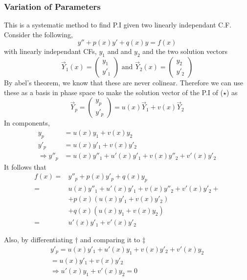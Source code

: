 \documentclass{article}
\begin{document}
\subsubsection{Variation of Parameters}
This is a systematic method to find P.I given two linearly independant C.F. 
Consider the following,
\[
    y'' + p(x) y' + q(x) y = f(x) \tag{$\star$}
\]
with linearly independant CFs, $y_1$ and and $y_2$ and the two solution vectors
\[
    \vec Y_1 (x) = \begin{pmatrix}
        y_1 \\ y'_1
    \end{pmatrix} \text{  and  }
    \vec Y_2 (x) = \begin{pmatrix}
        y_2 \\ y'_2
    \end{pmatrix}
\]
By abel's theorem, we know that these are never colinear. 
Therefore we can use these as a basis in phase space to make the solution vector of the P.I of ($\star$) as
\[
    \vec Y_p = \begin{pmatrix}
        y_p \\ y'_p
    \end{pmatrix} = u(x) \vec Y_1 + v(x) \vec Y_2
\]
In components,
\begin{align*}
    y_p &= u(x) y_1 + v(x) y_2 \tag{$\dagger$}\\
    y'_p &= u(x) y'_1 + v(x) y'_2 \tag{$\ddagger$}\\
    \Rightarrow y''_p &= u(x) y''_1 + u'(x) y'_1 + v(x) y''_2 + v'(x) y'_2
\end{align*}
It follows that
\begin{align*}
    f(x) =& y''_p + p(x) y'_p + q(x) y_p \\
    =& u(x) y''_1 + u'(x) y'_1 + v(x) y''_2 + v'(x) y'_2 + \\
    &+ p(x) (u(x) y'_1 + v(x) y'_2) \\
    &+ q(x) (u(x) y_1 + v(x) y_2) \\
    =& u'(x)y'_1 + v'(x)y'_2
\end{align*}

Also, by differentiating $\dagger$ and comparing it to $\ddagger$
\begin{align*}
    y'_p = u(x) y'_1 + u'(x) y_1 + v(x) y'_2 + v'(x) y_2 \\
    = u(x) y'_1 + v(x) y'_2 \tag{compare to $\ddagger$} \\
    \Rightarrow u'(x) y_1 + v'(x) y_2 = 0
\end{align*}
\end{document}
